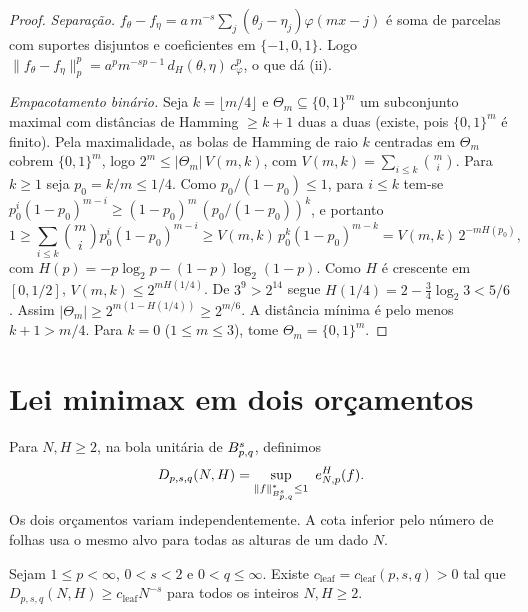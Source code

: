 \documentclass[12pt,a4paper]{article}
\begin{document}
\begin{proof}
\emph{Separação.} $f_\theta-f_\eta=a\,m^{-s}\sum_j(\theta_j-\eta_j)\varphi(mx-j)$ é soma de parcelas com suportes disjuntos e coeficientes em $\{-1,0,1\}$. Logo $\|f_\theta-f_\eta\|_p^p=a^pm^{-sp-1}\,d_H(\theta,\eta)\,c_\varphi^p$, o que dá (ii).

\emph{Empacotamento binário.} Seja $k=\lfloor m/4\rfloor$ e $\Theta_m\subseteq\{0,1\}^m$ um subconjunto maximal com distâncias de Hamming $\ge k+1$ duas a duas (existe, pois $\{0,1\}^m$ é finito). Pela maximalidade, as bolas de Hamming de raio $k$ centradas em $\Theta_m$ cobrem $\{0,1\}^m$, logo $2^m\le|\Theta_m|\,V(m,k)$, com $V(m,k)=\sum_{i\le k}\binom mi$. Para $k\ge1$ seja $p_0=k/m\le1/4$. Como $p_0/(1-p_0)\le1$, para $i\le k$ tem-se $p_0^i(1-p_0)^{m-i}\ge(1-p_0)^m\,(p_0/(1-p_0))^k$, e portanto
\[
1\ge\sum_{i\le k}\binom mi p_0^i(1-p_0)^{m-i}\ge V(m,k)\,p_0^k(1-p_0)^{m-k}=V(m,k)\,2^{-mH(p_0)},
\]
com $H(p)=-p\log_2p-(1-p)\log_2(1-p)$. Como $H$ é crescente em $[0,1/2]$, $V(m,k)\le2^{mH(1/4)}$. De $3^9>2^{14}$ segue $H(1/4)=2-\frac34\log_2 3<5/6$. Assim $|\Theta_m|\ge2^{m(1-H(1/4))}\ge2^{m/6}$. A distância mínima é pelo menos $k+1>m/4$. Para $k=0$ ($1\le m\le3$), tome $\Theta_m=\{0,1\}^m$.
\end{proof}

\section{Lei minimax em dois orçamentos}
\label{lp:sec:minimax}

Para $N,H\ge2$, na bola unitária de $B^{s}_{p,q}$, definimos
\[
 D_{p,s,q}(N,H)=\sup_{\|f\|^*_{\Bes{s}{p}{q}}\le1}\ e^H_{N,p}(f).
\]
Os dois orçamentos variam independentemente. A cota inferior pelo número de folhas usa o mesmo alvo para todas as alturas de um dado $N$.

\begin{lema}
\label{lp:lem:leaf-budget-floor}
Sejam $1\le p<\infty$, $0<s<2$ e $0<q\le\infty$. Existe $c_{\mathrm{leaf}}=c_{\mathrm{leaf}}(p,s,q)>0$ tal que $D_{p,s,q}(N,H)\ge c_{\mathrm{leaf}}N^{-s}$ para todos os inteiros $N,H\ge2$.
\end{lema}
\end{document}
